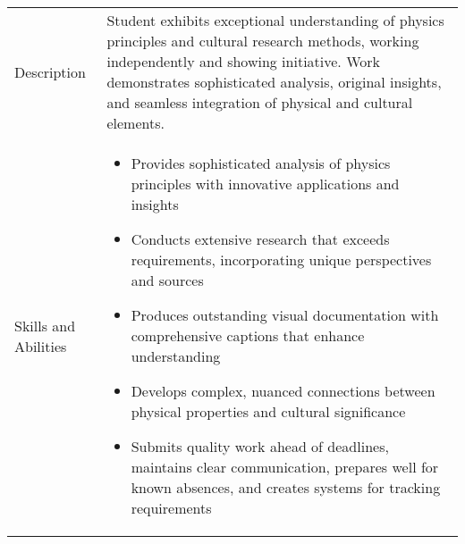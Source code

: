 \documentclass[12pt]{article}
\begin{document}
\begin{table}[b]
\renewcommand{\arraystretch}{1.5}
\begin{tabular}{>{\raggedright\arraybackslash}p{2cm}|>{\raggedright\arraybackslash}p{14cm}}
\toprule
\multicolumn{2}{l}{\textbf{Extending}} \\
\midrule
Description & Student exhibits exceptional understanding of physics principles and cultural research methods, working independently and showing initiative. Work demonstrates sophisticated analysis, original insights, and seamless integration of physical and cultural elements. \\
\midrule
Skills and Abilities & 
\begin{itemize}
    \item Provides sophisticated analysis of physics principles with innovative applications and insights
    \item Conducts extensive research that exceeds requirements, incorporating unique perspectives and sources
    \item Produces outstanding visual documentation with comprehensive captions that enhance understanding
    \item Develops complex, nuanced connections between physical properties and cultural significance
    \item Submits quality work ahead of deadlines, maintains clear communication, prepares well for known absences, and creates systems for tracking requirements
\end{itemize} \\
\bottomrule
\end{tabular}
\end{table}
\end{document}
